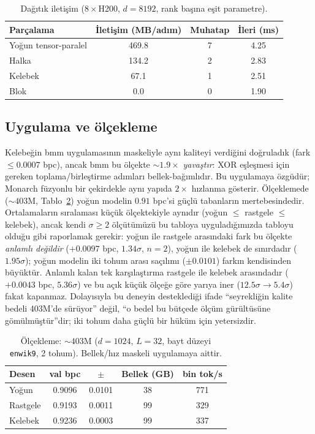 \documentclass[10pt,journal]{IEEEtran}
\begin{document}
\begin{table}[!t]
\centering
\footnotesize
\caption{Dağıtık iletişim ($8{\times}$H200, $d{=}8192$, rank başına eşit parametre).}
\label{tab:dagitik}
\begin{tabular}{@{}lccc@{}}
\toprule
Parçalama & İletişim (MB/adım) & Muhatap & İleri (ms) \\
\midrule
Yoğun tensor-paralel & 469.8 & 7 & 4.25 \\
Halka                & 134.2 & 2 & 2.83 \\
Kelebek              & 67.1  & 1 & 2.51 \\
Blok                 & 0.0   & 0 & 1.90 \\
\bottomrule
\end{tabular}
\end{table}

\subsection{Uygulama ve ölçekleme}
Kelebeğin bmm uygulamasının maskeliyle aynı kaliteyi verdiğini doğruladık (fark $\le 0.0007$
bpc), ancak bmm bu ölçekte $\sim\!1.9\times$ \emph{yavaştır}: XOR eşleşmesi için gereken
toplama/birleştirme adımları bellek-bağımlıdır. Bu uygulamaya özgüdür; Monarch \cite{dao2022}
füzyonlu bir çekirdekle aynı yapıda $2\times$ hızlanma gösterir. Ölçeklemede ($\sim\!403$M,
Tablo~\ref{tab:olcek}) yoğun modelin $0.91$ bpc'si güçlü tabanların mertebesindedir.
Ortalamaların sıralaması küçük ölçektekiyle aynıdır (yoğun $\le$ rastgele $\le$ kelebek),
ancak kendi $\sigma\!\ge\!2$ ölçütümüzü bu tabloya uyguladığımızda tabloyu olduğu gibi
raporlamak gerekir: yoğun ile rastgele arasındaki fark bu ölçekte \emph{anlamlı değildir}
($+0.0097$ bpc, $1.34\sigma$, $n{=}2$), yoğun ile kelebek de sınırdadır ($1.95\sigma$); yoğun
modelin iki tohum arası saçılımı ($\pm0.0101$) farkın kendisinden büyüktür. Anlamlı kalan tek
karşılaştırma rastgele ile kelebek arasındadır ($+0.0043$ bpc, $5.36\sigma$) ve bu açık küçük
ölçeğe göre yarıya iner ($12.5\sigma \to 5.4\sigma$) fakat kapanmaz. Dolayısıyla bu deneyin
desteklediği ifade ``seyrekliğin kalite bedeli 403M'de sürüyor'' değil, ``o bedel bu bütçede
ölçüm gürültüsüne gömülmüştür''dir; iki tohum daha güçlü bir hüküm için yetersizdir.

\begin{table}[!t]
\centering
\footnotesize
\caption{Ölçekleme: $\sim\!403$M ($d{=}1024$, $L{=}32$, bayt düzeyi \texttt{enwik9}, 2 tohum).
Bellek/hız maskeli uygulamaya aittir.}
\label{tab:olcek}
\begin{tabular}{@{}lcccc@{}}
\toprule
Desen & val bpc & $\pm$ & Bellek (GB) & bin tok/s \\
\midrule
Yoğun    & 0.9096 & 0.0101 & 38 & 771 \\
Rastgele & 0.9193 & 0.0011 & 99 & 329 \\
Kelebek  & 0.9236 & 0.0003 & 99 & 337 \\
\bottomrule
\end{tabular}
\end{table}
\end{document}
